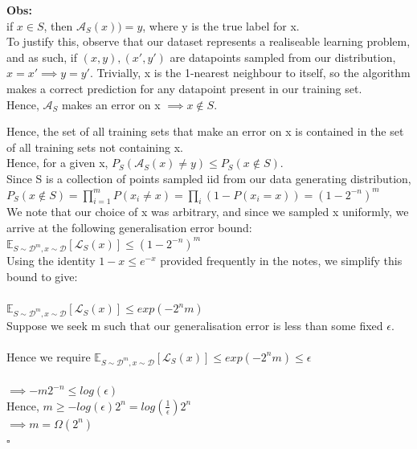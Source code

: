 \documentclass[12pt]{article}
\begin{document}
\begin{itemize}
    \textbf{Obs:}\\
    if $x \in S$, then $\mathcal{A}_{S}(x)) = y$, where y is the true label for x. \\

    To justify this, observe that our dataset represents a realiseable learning problem,
    and as such, if $(x,y), (x \prime,y \prime)$ are datapoints sampled from our distribution,
    $x = x \prime \implies y = y \prime $. Trivially, x is the 1-nearest neighbour to itself,
    so the algorithm makes a correct prediction for any datapoint present in our training set.\\

    Hence, $\mathcal{A}_{S}$ makes an error on x $\implies x \notin S$.
    
    Hence, the set of all training sets that make an error on x is contained in the set of all
    training sets not containing x. \\

    Hence, for a given x, $P_{S}(\mathcal{A}_{S}(x) \ne y) \le P_{S}(x \notin S)$.\\

    Since S is a collection of points sampled iid from our data generating distribution, \\
    $P_{S}(x \notin S) = \prod_{i=1}^{m}P(x_{i} \ne x) = \prod_{i}(1 - P(x_{i} = x)) = (1 - 2^{-n})^{m}$\\

    We note that our choice of x was arbitrary, and since we sampled x uniformly, we arrive at the 
    following generalisation error bound:\\

    $\mathbb{E}_{S \sim \mathcal{D}^{m}, x \sim \mathcal{D}}[\mathcal{L}_{S}(x)] \le (1 - 2^{-n})^{m} $\\
    Using the identity $1-x \le e^{-x}$ provided frequently in the notes, we simplify this bound to give:
    \\
    \\

    $\mathbb{E}_{S \sim \mathcal{D}^{m}, x \sim \mathcal{D}}[\mathcal{L}_{S}(x)] \le exp(-2^{n}m)$
    \\
    Suppose we seek m such that our generalisation error is less than some fixed $\epsilon$. \\
    \\
    Hence we require $\mathbb{E}_{S \sim \mathcal{D}^{m}, x \sim \mathcal{D}}[\mathcal{L}_{S}(x)] \le exp(-2^{n}m) \le \epsilon$\\
    \\
    $\implies -m2^{-n} \le log(\epsilon)$\\

    Hence, $m \ge -log(\epsilon)2^{n} = log(\frac{1}{\epsilon}) 2^{n}$\\

    $\implies m = \Omega(2^{n})$\\
    $\square$
\end{itemize}
\end{document}
